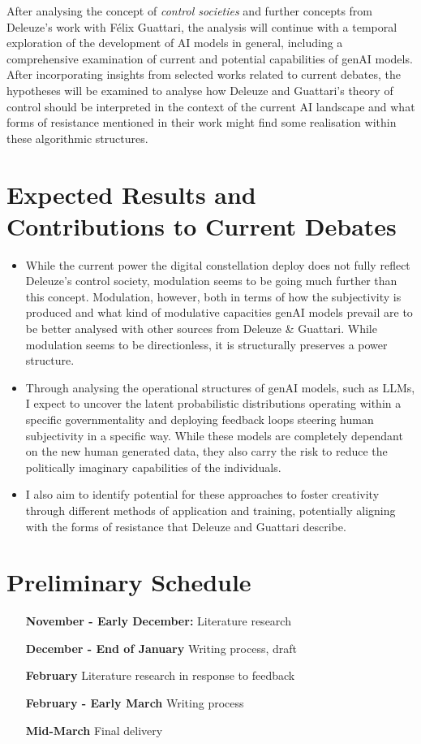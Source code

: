 After analysing the concept of \textit{control societies} and further concepts from Deleuze’s work with Félix Guattari, the analysis will continue with a temporal exploration of the development of AI models in general, including a comprehensive examination of current and potential capabilities of genAI models. After incorporating insights from selected works related to current debates, the hypotheses will be examined to analyse how Deleuze and Guattari’s theory of control should be interpreted in the context of the current AI landscape and what forms of resistance mentioned in their work might find some realisation within these algorithmic structures.


\section{Expected Results and Contributions to Current Debates}

\begin{itemize}
	\item While the current power the digital constellation deploy does not fully reflect Deleuze's control society, modulation seems to be going much further than this concept. Modulation, however, both in terms of how the subjectivity is produced and what kind of modulative capacities genAI models prevail are to be better analysed with other sources from Deleuze \& Guattari. While modulation seems to be directionless, it is structurally preserves a power structure.
	\item Through analysing the operational structures of genAI models, such as LLMs, I expect to uncover the latent probabilistic distributions operating within a specific governmentality and deploying feedback loops steering human subjectivity in a specific way. While these models are completely dependant on the new human generated data, they also carry the risk to reduce the politically imaginary capabilities of the individuals.
	\item  I also aim to identify potential for these approaches to foster creativity through different methods of application and training, potentially aligning with the forms of resistance that Deleuze and Guattari describe.
\end{itemize}

\section{Preliminary Schedule}
\begin{itemize}
	\item [\textbf{November - Early December:}] Literature research
	\item [\textbf{December - End of January}] Writing process, draft
	\item [\textbf{February}] Literature research in response to feedback
	\item [\textbf{February - Early March}] Writing process
	\item [\textbf{Mid-March}] Final delivery
\end{itemize}


